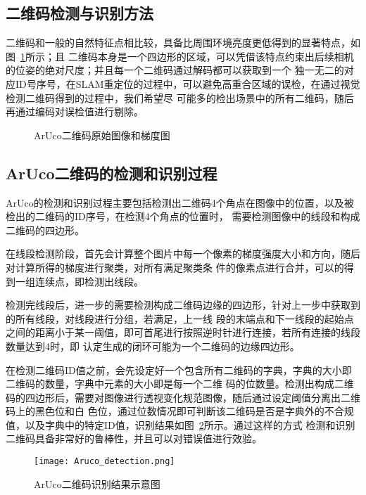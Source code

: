 \subsection{二维码检测与识别方法}
\label{sec:2.2.1}
二维码和一般的自然特征点相比较，具备比周围环境亮度更低得到的显著特点，如图~\ref{fig:Aruco_Aruco_Gradient}所示；且
二维码本身是一个四边形的区域，可以凭借该特点约束出后续相机的位姿的绝对尺度；并且每一个二维码通过解码都可以获取到一个
独一无二的对应ID号序号，在SLAM重定位的过程中，可以避免高重合区域的误检，在通过视觉检测二维码得到的过程中，我们希望尽
可能多的检出场景中的所有二维码，随后再通过编码对误检值进行剔除。
\begin{figure}[H]
  \centering%
  \hspace{4em}%
  \caption{ArUco二维码原始图像和梯度图}
  \label{fig:Aruco_Aruco_Gradient}
\end{figure}

\subsection{ArUco二维码的检测和识别过程}
\label{sec:2.2.2}
ArUco的检测和识别过程主要包括检测出二维码4个角点在图像中的位置，以及被检出的二维码的ID序号，在检测4个角点的位置时，
需要检测图像中的线段和构成二维码的四边形。

在线段检测阶段，首先会计算整个图片中每一个像素的梯度强度大小和方向，随后对计算所得的梯度进行聚类，对所有满足聚类条
件的像素点进行合并，可以的得到一组连续点，即检测出线段。

检测完线段后，进一步的需要检测构成二维码边缘的四边形，针对上一步中获取到的所有线段，对线段进行分组，若满足，上一线
段的末端点和下一线段的起始点之间的距离小于某一阈值，即可首尾进行按照逆时针进行连接，若所有连接的线段数量达到4时，即
认定生成的闭环可能为一个二维码的边缘四边形。

在检测二维码ID值之前，会先设定好一个包含所有二维码的字典，字典的大小即二维码的数量，字典中元素的大小即是每一个二维
码的位数量。检测出构成二维码的四边形后，需要对图像进行透视变化规范图像，随后通过设定阈值分离出二维码上的黑色位和白
色位，通过位数情况即可判断该二维码是否是字典外的不合规值，以及字典中的特定ID值，识别结果如图~\ref{fig:Aruco_detection}所示。通过这样的方式
检测和识别二维码具备非常好的鲁棒性，并且可以对错误值进行效验。
\begin{figure}[H] %
  \centering
  \texttt{[image: Aruco\_detection.png]}
  \caption{ArUco二维码识别结果示意图}
  \label{fig:Aruco_detection}
\end{figure}

